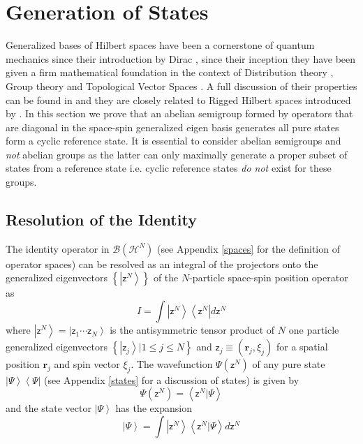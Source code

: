 \documentclass[aps,preprint]{revtex4}%
\begin{document}
\section{Generation of States\label{Semi}}

Generalized bases of Hilbert spaces have been a cornerstone of quantum
mechanics since their introduction by Dirac \cite{P.A.M.Dirac}, since their
inception they have been given a firm mathematical foundation in the context
of Distribution theory \cite{Richtmyer}, Group theory \cite{Barut} and
Topological Vector Spaces \cite{Robertson}. A full discussion of their
properties can be found in \cite{Berezin91} and they are closely related to
Rigged Hilbert spaces introduced by \cite{Bohm78}. In this section we prove
that an abelian semigroup formed by operators that are diagonal in the
space-spin generalized eigen basis generates all pure states form a cyclic
\cite{Encyclo} reference state. It is essential to consider abelian semigroups
and \emph{not} abelian groups as the latter can only maximally generate a
proper subset of states from a reference state i.e. cyclic reference states
\emph{do not} exist for these groups.

\subsection{Resolution of the Identity}

The identity operator in $\mathcal{B}\left(  \mathcal{H}^{N}\right)  $ (see
Appendix \ref{spaces} for the definition of operator spaces) can be resolved
as an integral of the projectors onto the generalized eigenvectors $\left\{
\left\vert \mathsf{z}^{N}\right\rangle \right\}  $ of the $N$-particle
space-spin position operator as%
\begin{equation}
I=\int\left\vert \mathsf{z}^{N}\right\rangle \left\langle \mathsf{z}%
^{N}\right\vert d\mathsf{z}^{N}%
\end{equation}
where $\left\vert \mathsf{z}^{N}\right\rangle =\left\vert \mathsf{z}_{1}%
\cdots\mathsf{z}_{N}\right\rangle $ is the antisymmetric tensor product of $N$
one particle generalized eigenvectors $\left\{  \left\vert \mathsf{z}%
_{j}\right\rangle |1\leq j\leq N\right\}  $ and $\mathsf{z}_{j}\equiv\left(
\mathbf{r}_{j},\xi_{j}\right)  $ for a spatial position $\mathbf{r}_{j}$ and
spin vector $\xi_{j}$. The wavefunction $\Psi\left(  \mathsf{z}^{N}\right)  $
of any pure state $\left\vert \Psi\right\rangle \left\langle \Psi\right\vert $
(see Appendix \ref{states} for a discussion of states) is given by
\begin{equation}
\Psi\left(  \mathsf{z}^{N}\right)  =\left\langle \mathsf{z}^{N}|\Psi
\right\rangle
\end{equation}
and the state vector $\left\vert \Psi\right\rangle $ has the expansion
\begin{equation}
\left\vert \Psi\right\rangle =\int\left\vert \mathsf{z}^{N}\right\rangle
\left\langle \mathsf{z}^{N}|\Psi\right\rangle d\mathsf{z}^{N}%
\end{equation}
\end{document}
